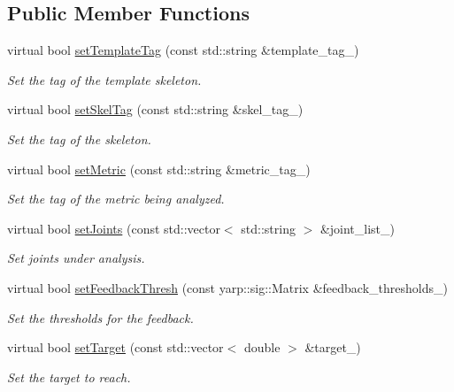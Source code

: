 \subsection*{Public Member Functions}
\begin{DoxyCompactItemize}
\item 
virtual bool \mbox{\hyperlink{classfeedbackProducer__IDL_a9d73388746fdad03567b1930c964c61d}{set\+Template\+Tag}} (const std\+::string \&template\+\_\+tag\+\_\+)
\begin{DoxyCompactList}\small\item\em Set the tag of the template skeleton. \end{DoxyCompactList}\item 
virtual bool \mbox{\hyperlink{classfeedbackProducer__IDL_a415d86e692f8bb4987229f17ca0d90a5}{set\+Skel\+Tag}} (const std\+::string \&skel\+\_\+tag\+\_\+)
\begin{DoxyCompactList}\small\item\em Set the tag of the skeleton. \end{DoxyCompactList}\item 
virtual bool \mbox{\hyperlink{classfeedbackProducer__IDL_a364738f5e3477e52c76d2a22672d840b}{set\+Metric}} (const std\+::string \&metric\+\_\+tag\+\_\+)
\begin{DoxyCompactList}\small\item\em Set the tag of the metric being analyzed. \end{DoxyCompactList}\item 
virtual bool \mbox{\hyperlink{classfeedbackProducer__IDL_a13778ed7bd818fb0093565ff99d936a6}{set\+Joints}} (const std\+::vector$<$ std\+::string $>$ \&joint\+\_\+list\+\_\+)
\begin{DoxyCompactList}\small\item\em Set joints under analysis. \end{DoxyCompactList}\item 
virtual bool \mbox{\hyperlink{classfeedbackProducer__IDL_a509606998529f964664fa22b4457cee2}{set\+Feedback\+Thresh}} (const yarp\+::sig\+::\+Matrix \&feedback\+\_\+thresholds\+\_\+)
\begin{DoxyCompactList}\small\item\em Set the thresholds for the feedback. \end{DoxyCompactList}\item 
virtual bool \mbox{\hyperlink{classfeedbackProducer__IDL_a029ad9dc9918e229624d0dac6f6ca42e}{set\+Target}} (const std\+::vector$<$ double $>$ \&target\+\_\+)
\begin{DoxyCompactList}\small\item\em Set the target to reach. \end{DoxyCompactList}\item 

\end{DoxyCompactItemize}
